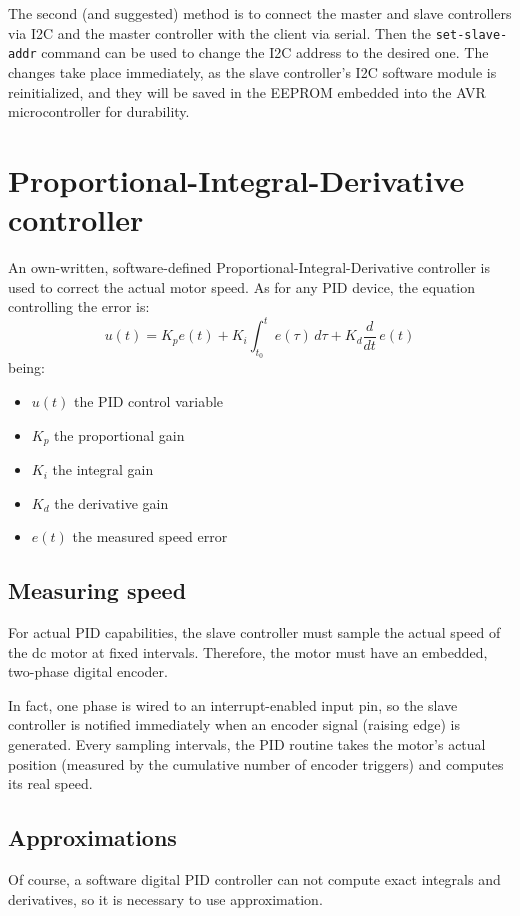 \documentclass[binding=0.6cm,Lau]{sapthesis}
\begin{document}
The second (and suggested) method is to connect the master and slave
controllers via I2C and the master controller with the client via serial. Then
the \texttt{set-slave-addr} command can be used to change the I2C address to
the desired one. The changes take place immediately, as the slave controller's
I2C software module is reinitialized, and they will be saved in the EEPROM
embedded into the AVR microcontroller for durability.

\section{Proportional-Integral-Derivative controller}
An own-written, software-defined Proportional-Integral-Derivative controller is
used to correct the actual motor speed. As for any PID device, the equation
controlling the error is:
\begin{equation}
  u(t) = K_p e(t) + K_i \int_{t_0}^t e(\tau)\,d\tau + K_d \frac{d}{dt}\,e(t)
\end{equation}
being:
\begin{itemize}
  \item $u(t)$ the PID control variable
  \item $K_p$ the proportional gain
  \item $K_i$ the integral gain
  \item $K_d$ the derivative gain
  \item $e(t)$ the measured speed error
\end{itemize}

\subsection{Measuring speed}
For actual PID capabilities, the slave controller must sample the actual speed
of the dc motor at fixed intervals. Therefore, the motor must have an embedded,
two-phase digital encoder.

In fact, one phase is wired to an interrupt-enabled input pin, so the slave
controller is notified immediately when an encoder signal (raising edge) is
generated. Every sampling intervals, the PID routine takes the motor's actual
position (measured by the cumulative number of encoder triggers) and computes
its real speed.

\subsection{Approximations}
Of course, a software digital PID controller can not compute exact integrals
and derivatives, so it is necessary to use approximation.
\end{document}
